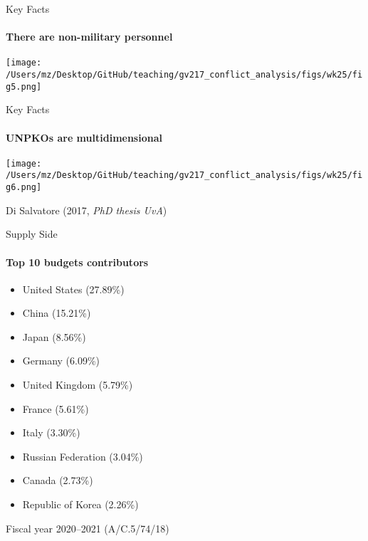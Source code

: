 \documentclass{beamer}
\begin{document}
\begin{frame}{Key Facts}
\framesubtitle{There are non-military personnel}
    \pause
    \begin{center}
        \texttt{[image: /Users/mz/Desktop/GitHub/teaching/gv217\_conflict\_analysis/figs/wk25/fig5.png]}
    \end{center}
\end{frame}

\begin{frame}{Key Facts}
    \framesubtitle{UNPKOs are multidimensional}
    \pause
    \begin{center}
        \texttt{[image: /Users/mz/Desktop/GitHub/teaching/gv217\_conflict\_analysis/figs/wk25/fig6.png]}
    \end{center}
    \tiny Di Salvatore (2017, \textit{PhD thesis UvA})
\end{frame}    

\begin{frame}{Supply Side}
\framesubtitle{Top 10 budgets contributors}
\begin{itemize}
    \pause\item {} United States (27.89\%)
    \pause\item {} China (15.21\%)
    \pause\item {} Japan (8.56\%)
    \pause\item {} Germany (6.09\%)
    \pause\item {} United Kingdom (5.79\%)
    \pause\item {} France (5.61\%)
    \pause\item {} Italy (3.30\%)
    \pause\item {} Russian Federation (3.04\%)
    \pause\item {} Canada (2.73\%)
    \pause\item {} Republic of Korea (2.26\%)
\end{itemize}
\tiny Fiscal year 2020--2021 (A/C.5/74/18)
\end{frame}
\end{document}
